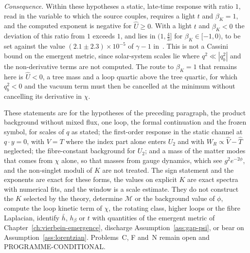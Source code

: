 \emph{Consequence.} Within these hypotheses a static, late-time response with ratio \(1\), read in the variable to which the source couples, requires a light \(t\) and \(\beta_K=1\), and the computed exponent is negative for \(\hat U\ge0\). With a light \(t\) and \(\beta_K<0\) the deviation of this ratio from \(1\) exceeds \(1\), and lies in \((1,\tfrac43]\) for \(\beta_K\in[-1,0)\), to be set against the value \((2.1\pm2.3)\times10^{-5}\) of \(\gamma-1\) in~\cite{Bertotti2003}. This is not a Cassini bound on the emergent metric, since solar-system scales lie where \(q^2\ll|q_b^2|\) and the non-derivative terms are not computed. The route to \(\beta_K=1\) that remains here is \(\hat U<0\), a tree mass and a loop quartic above the tree quartic, for which \(q_b^2<0\) and the vacuum term must then be cancelled at the minimum without cancelling its derivative in \(\chi\).

These statements are for the hypotheses of the preceding paragraph, the product background without mixed flux, one loop, the formal continuation and the frozen symbol, for scales of \(q\) as stated; the first-order response in the static channel at \(q\cdot y=0\), with \(V=T\) where the index part alone enters \(U_2\) and with \(W_R\propto\hat V-\hat T\) neglected; the fibre-constant background for \(U_2\); and a mass of the matter modes that comes from \(\chi\) alone, so that masses from gauge dynamics, which see \(g^2e^{-2\phi}\), and the non-singlet moduli of \(K\) are not treated. The sign statement and the exponents are exact for these forms, the values on explicit \(K\) are exact spectra with numerical fits, and the window is a scale estimate. They do not construct the \(K\) selected by the theory, determine \(\mathcal M\) or the background value of \(\phi\), compute the loop kinetic term of \(\chi\), the rotating class, higher loops or the fibre Laplacian, identify \(\bar h\), \(h_\beta\) or \(t\) with quantities of the emergent metric of Chapter~\ref{ch:vierbein-emergence}, discharge Assumption~\ref{ass:gap-psi}, or bear on Assumption~\ref{ass:lorentzian}. Problems~C, F and~N remain open and PROGRAMME-CONDITIONAL.

